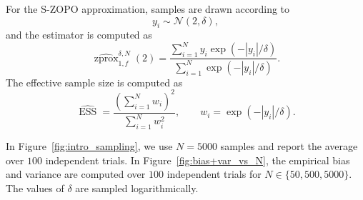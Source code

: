 \documentclass{article}
\newcommand{\szprox}{\ensuremath{\widehat{\operatorname{zprox}}}}
\begin{document}
For the S-ZOPO approximation, samples are drawn according to
\[
    y_i\sim \mathcal N(2,\delta),
\]
and the estimator is computed as
\[
    \szprox^{\delta,N}_{1,f}(2)
    =
    \frac{\sum_{i=1}^N y_i\exp(-|y_i|/\delta)}
    {\sum_{i=1}^N \exp(-|y_i|/\delta)}.
\]
The effective sample size is computed as
\[
    \widehat{\operatorname{ESS}}
    =
    \frac{\left(\sum_{i=1}^N w_i\right)^2}
    {\sum_{i=1}^N w_i^2},
    \qquad
    w_i=\exp(-|y_i|/\delta).
\]

In Figure~\ref{fig:intro_sampling}, we use \(N=5000\) samples and report the average over \(100\) independent trials. In Figure~\ref{fig:bias+var_vs_N}, the empirical bias and variance are computed over \(100\) independent trials for \(N\in\{50,500,5000\}\). The values of \(\delta\) are sampled logarithmically.
\end{document}
